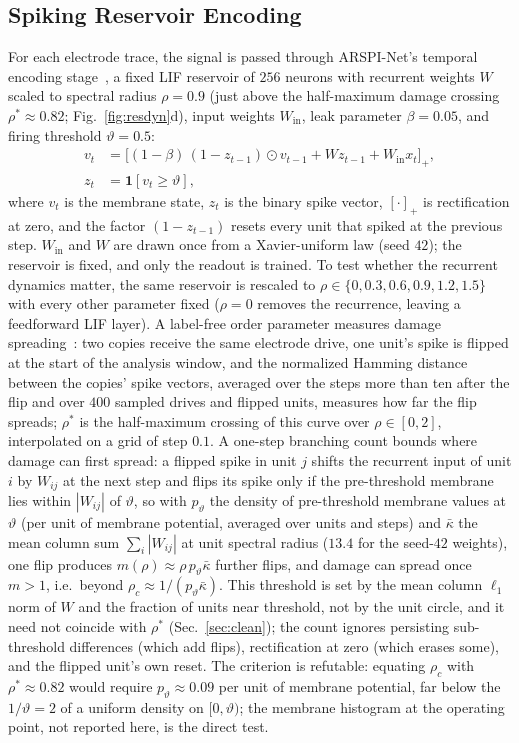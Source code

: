 \documentclass[conference]{IEEEtran}
\newcommand{\Ind}{\mathbf{1}}
\begin{document}
\subsection{Spiking Reservoir Encoding}
For each electrode trace, the signal is passed through ARSPI-Net's temporal encoding stage~\cite{lane2023arspi,lane2024arspi}, a fixed LIF reservoir of $256$ neurons with recurrent weights $W$ scaled to spectral radius $\rho=0.9$ (just above the half-maximum damage crossing $\rho^\ast\approx0.82$; Fig.~\ref{fig:resdyn}d), input weights $W_{\mathrm{in}}$, leak parameter $\beta=0.05$, and firing threshold $\vartheta=0.5$:
\begin{align}
    v_{t} &= \big[(1-\beta)\,(1-z_{t-1})\odot v_{t-1} + W z_{t-1} + W_{\mathrm{in}}x_t\big]_+, \\
    z_{t} &= \Ind[v_{t}\geq \vartheta],
\end{align}
where $v_t$ is the membrane state, $z_t$ is the binary spike vector, $[\cdot]_+$ is rectification at zero, and the factor $(1-z_{t-1})$ resets every unit that spiked at the previous step. $W_{\mathrm{in}}$ and $W$ are drawn once from a Xavier-uniform law (seed $42$); the reservoir is fixed, and only the readout is trained. To test whether the recurrent dynamics matter, the same reservoir is rescaled to $\rho\in\{0,0.3,0.6,0.9,1.2,1.5\}$ with every other parameter fixed ($\rho=0$ removes the recurrence, leaving a feedforward LIF layer). A label-free order parameter measures damage spreading~\cite{bertschinger2004realtime}: two copies receive the same electrode drive, one unit's spike is flipped at the start of the analysis window, and the normalized Hamming distance between the copies' spike vectors, averaged over the steps more than ten after the flip and over $400$ sampled drives and flipped units, measures how far the flip spreads; $\rho^\ast$ is the half-maximum crossing of this curve over $\rho\in[0,2]$, interpolated on a grid of step $0.1$. A one-step branching count bounds where damage can first spread: a flipped spike in unit $j$ shifts the recurrent input of unit $i$ by $W_{ij}$ at the next step and flips its spike only if the pre-threshold membrane lies within $|W_{ij}|$ of $\vartheta$, so with $p_\vartheta$ the density of pre-threshold membrane values at $\vartheta$ (per unit of membrane potential, averaged over units and steps) and $\bar\kappa$ the mean column sum $\sum_i|W_{ij}|$ at unit spectral radius ($13.4$ for the seed-$42$ weights), one flip produces $m(\rho)\approx\rho\,p_\vartheta\bar\kappa$ further flips, and damage can spread once $m>1$, i.e.\ beyond $\rho_c\approx1/(p_\vartheta\bar\kappa)$. This threshold is set by the mean column $\ell_1$ norm of $W$ and the fraction of units near threshold, not by the unit circle, and it need not coincide with $\rho^\ast$ (Sec.~\ref{sec:clean}); the count ignores persisting sub-threshold differences (which add flips), rectification at zero (which erases some), and the flipped unit's own reset. The criterion is refutable: equating $\rho_c$ with $\rho^\ast\approx0.82$ would require $p_\vartheta\approx0.09$ per unit of membrane potential, far below the $1/\vartheta=2$ of a uniform density on $[0,\vartheta)$; the membrane histogram at the operating point, not reported here, is the direct test.
\end{document}
